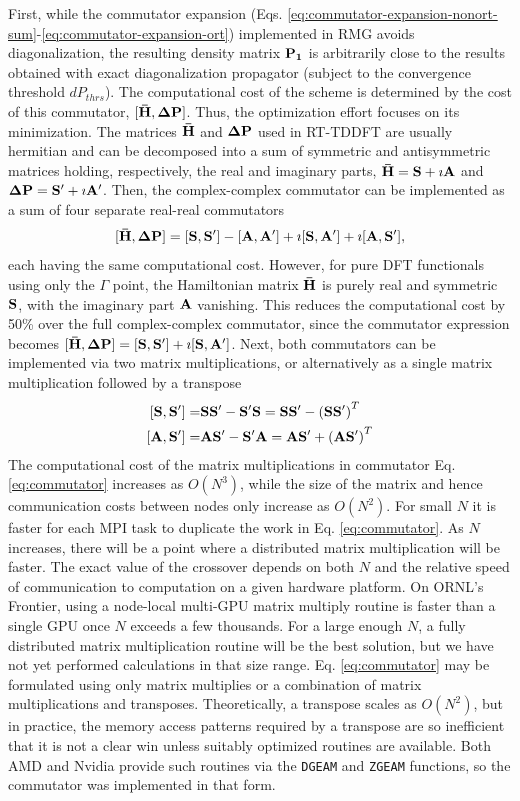 \documentclass[journal=jctcce,manuscript=article,etalmode=truncate,maxauthors=10,layout=twocolumn,9pt]{achemso}   %
\begin{document}
First, while the commutator expansion (Eqs. \ref{eq:commutator-expansion-nonort-sum}-\ref{eq:commutator-expansion-ort})
implemented  in RMG avoids  diagonalization, the resulting density matrix $\vb{P_1}$  
is  arbitrarily close to the results obtained with exact diagonalization propagator 
(subject to the convergence threshold  $dP_{thrs}$). 
The computational cost  of the scheme  is  determined  by  the cost of this commutator,
 $\vb{[\bar H, \Delta P]}$. Thus, the optimization effort focuses on its minimization.
The  matrices $\vb{\bar H}$ and  $\vb{\Delta P}$  used  in RT-TDDFT are usually  hermitian 
and can be decomposed  into a sum  of symmetric and antisymmetric matrices holding, respectively, the real and imaginary parts,  
$\vb{\bar H = S +\imath A}$ and $\vb{\Delta P= S' + \imath  A'}$. 
Then, the complex-complex commutator can be implemented as  a sum  of four separate real-real  commutators
\begin{equation}
\vb{ [\bar H, \Delta P] = [S,S'] - [A,A'] + \imath[S,A'] +\imath[A,S']},
\label{eq:commutator}
\end{equation}
each having the same computational cost. However, for pure DFT functionals using only the  $\Gamma$ point, 
the Hamiltonian  matrix $\vb{ \bar H}$ is purely real and symmetric $\vb{S}$, with the imaginary 
part $\vb{A}$ vanishing. This reduces the computational cost by 50\% over 
the full complex-complex commutator, since the commutator expression becomes
$\vb{ [\bar H, \Delta P] = [S,S'] + \imath[S,A']}$.
Next, both commutators can be  implemented via two  matrix multiplications, or alternatively as a single 
matrix multiplication followed by a transpose
\begin{align}
\nonumber \vb{[S,S']} =& \vb{SS' -S'S } =\vb{  SS' - (SS')}^T \\
\nonumber \vb{[A,S']} =& \vb{AS' -S'A } =\vb{  AS' + (AS')}^T 
\end{align}
The computational 
cost of the matrix multiplications in commutator Eq. \ref{eq:commutator} increases as $O(N^3)$, 
while the size of the matrix and hence communication costs between nodes only increase as $O(N^2)$. 
For small $N$ it is 
faster for each MPI task to duplicate the work in Eq. \ref{eq:commutator}. 
As $N$ increases, there will be a point where 
a distributed matrix multiplication will be faster. The exact value of the crossover depends on 
both $N$ and the relative speed of communication to computation on a given hardware platform. On ORNL's Frontier, 
using a node-local multi-GPU matrix multiply routine is faster than a single GPU once $N$ exceeds a few thousands. 
For a large enough $N$, a fully distributed matrix multiplication routine will be the best solution, 
but we have not yet performed calculations in that size range. 
Eq. \ref{eq:commutator} may be formulated using 
only matrix multiplies or a combination of matrix multiplications and transposes. Theoretically, a transpose 
scales as $O(N^2)$, but in practice, the memory access patterns required by a transpose are so inefficient 
that it is not a clear win unless suitably optimized routines are available. 
Both AMD and Nvidia provide such routines via the \texttt{DGEAM} and \texttt{ZGEAM}  
functions, so the commutator was implemented in that form.
\end{document}
